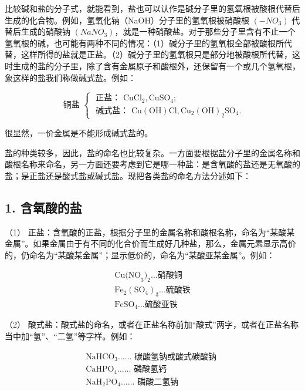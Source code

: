 比较碱和盐的分子式，就能看到，盐也可以认作是碱分子里的氢氧根被酸根代替后生成的化合物。例如，氢氧化钠（NaOH）分子里的氢氧根被硝酸根
\((-NO_{3})\) 代替后生成的硝酸钠
\((NaNO_{3})\)，就是一种硝酸盐。对于那些分子里含有不止一个氢氧根的碱，也可能有两种不同的情况：（1）碱分子里的氢氧根全部被酸根所代替，这样所得的盐就是正盐。（2）碱分子里的氢氧根只是部分地被酸根所代替，这时生成的盐的分子里，除了含有金属原子和酸根外，还保留有一个或几个氢氧根，象这样的盐我们称做碱式盐。例如：

\[
\text{ 铜盐 } \left\{ \begin{array}{ll} \text{ 正盐： } \mathrm{CuCl}_{2}, \mathrm{CuSO}_{4}; \\ \text{ 碱式盐： } \mathrm{Cu(OH)Cl}, \mathrm{Cu}_{2} (\mathrm{OH}) _ {2} \mathrm{SO}_{4}. \end{array} \right.
\]

很显然，一价金属是不能形成碱式盐的。

盐的种类较多，因此，盐的命名也比较复杂。一方面要根据盐分子里的金属名称和酸根名称来命名，另一方面还要考虑到它是哪一种盐：是含氧酸的盐还是无氧酸的盐；是正盐还是酸式盐或碱式盐。现把各类盐的命名方法分述如下：

\subsection{1. 含氧酸的盐}

（1）
正盐：含氧酸的正盐，根据分子里的金属名称和酸根名称，命名为``某酸某金属''。如果金属由于有不同的化合价而生成好几种盐，那么，金属元素显示高价的，仍命名为``某酸某金属''；显示低价的，命名为``某酸亚某金属''。例如：

\[
\begin{array}{l}\mathrm{Cu(NO}_{3})_{2}\ldots\text{硝酸铜}\\\mathrm{Fe}_{2}(\mathrm{SO}_{4})_{3}\ldots\text{硫酸铁}\\\mathrm{FeSO}_{4}\ldots\text{硫酸亚铁}\end{array}
\]

（2）
酸式盐：酸式盐的命名，或者在正盐名称前加``酸式''两字，或者在正盐名称当中加``氢''、``二氢''等字样。例如：

\[
\begin{array}{l} \mathrm{NaHCO}_{3} \dots \dots \text{ 碳酸氢钠或酸式碳酸钠 } \\ \mathrm{CaHPO}_{4} \dots \dots \text{ 磷酸氢钙 } \\ \mathrm{NaH}_{2} \mathrm{PO}_{4} \dots \dots \text{ 磷酸二氢钠 } \\ \end{array}
\]

